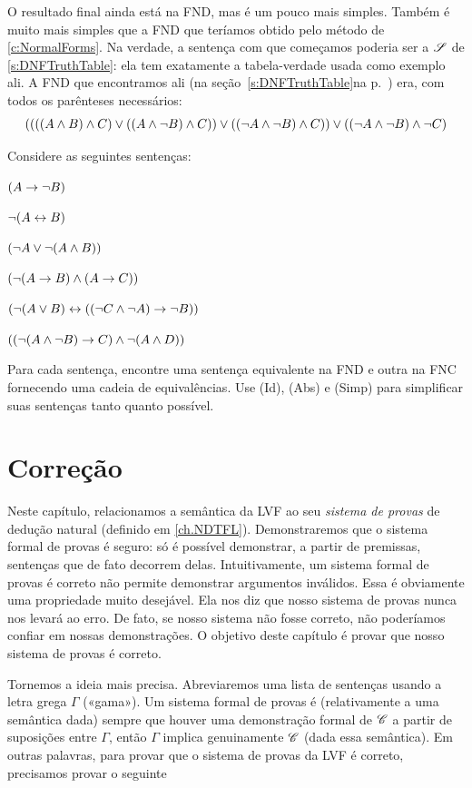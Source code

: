 O resultado final ainda está na FND, mas é um pouco mais simples. Também é muito mais simples que a FND que teríamos obtido pelo método de \cref{c:NormalForms}. Na verdade, a sentença com que começamos poderia ser a $\mathscr{S}$ de \cref{s:DNFTruthTable}: ela tem exatamente a tabela-verdade usada como exemplo ali. A FND que encontramos ali (\ifHTMLtarget na seção~\cref{s:DNFTruthTable}\else na p.~\pageref{longDNF}\fi) era, com todos os parênteses necessários:
$$((((A \wedge B) \wedge C) \vee ((A \wedge \neg B) \wedge C)) \vee ((\neg A \wedge \neg B) \wedge C)) \vee ((\neg A \wedge \neg B) \wedge \neg C)$$

\practiceproblems
\problempart
\label{pr.DNF2}
Considere as seguintes sentenças:
\begin{compactlist}
	\item $(A \rightarrow \neg B)$
	\item $\neg (A \leftrightarrow B)$
	\item $(\neg A \vee \neg (A \wedge B))$
	\item $(\neg (A \rightarrow B ) \wedge (A \rightarrow C))$
	\item $(\neg (A \vee B) \leftrightarrow ((\neg C \wedge \neg A) \rightarrow \neg B))$
	\item $((\neg (A \wedge \neg B) \rightarrow C) \wedge \neg (A \wedge D))$
\end{compactlist}
Para cada sentença, encontre uma sentença equivalente na FND e outra na FNC fornecendo uma cadeia de equivalências. Use (Id), (Abs) e (Simp) para simplificar suas sentenças tanto quanto possível.

\chapter{Correção}\label{ch:Soundness}

Neste capítulo, relacionamos a semântica da LVF ao seu \emph{sistema de provas} de dedução natural (definido em \cref{ch.NDTFL}). Demonstraremos que o sistema formal de provas é seguro: só é possível demonstrar, a partir de premissas, sentenças que de fato decorrem delas.
Intuitivamente, um sistema formal de provas é correto \emph{\ifeff} não permite demonstrar argumentos inválidos. Essa é obviamente uma propriedade muito desejável. Ela nos diz que nosso sistema de provas nunca nos levará ao erro. De fato, se nosso sistema não fosse correto, não poderíamos confiar em nossas demonstrações. O objetivo deste capítulo é provar que nosso sistema de provas é correto.

Tornemos a ideia mais precisa. Abreviaremos uma lista de sentenças usando a letra grega $\Gamma$ («gama»). Um sistema formal de provas é  (relativamente a uma semântica dada) \emph{\ifeff} sempre que houver uma demonstração formal de $\mathscr{C}$ a partir de suposições entre $\Gamma$, então $\Gamma$ implica genuinamente $\mathscr{C}$ (dada essa semântica). Em outras palavras, para provar que o sistema de provas da LVF é correto, precisamos provar o seguinte

